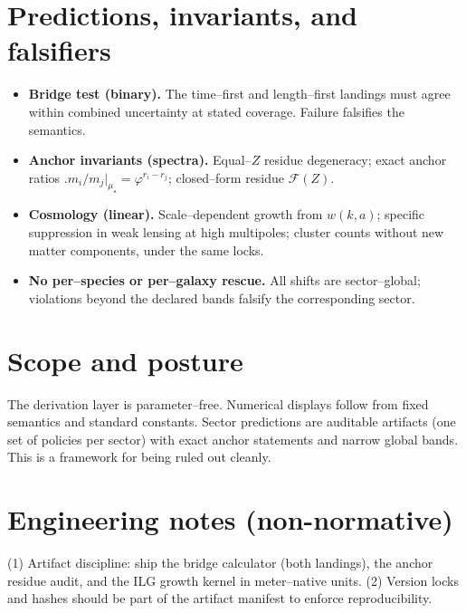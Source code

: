 \documentclass[11pt]{article}
\begin{document}
\section*{Predictions, invariants, and falsifiers}
\begin{itemize}
  \item \textbf{Bridge test (binary).} The time--first and length--first landings must agree within combined uncertainty at stated coverage. Failure falsifies the semantics.
  \item \textbf{Anchor invariants (spectra).} Equal--$Z$ residue degeneracy; exact anchor ratios $\bigl.m_i/m_j\bigr|_{\mu_\star}=\varphi^{r_i-r_j}$; closed--form residue $\mathcal F(Z)$.
  \item \textbf{Cosmology (linear).} Scale--dependent growth from $w(k,a)$; specific suppression in weak lensing at high multipoles; cluster counts without new matter components, under the same locks.
  \item \textbf{No per--species or per--galaxy rescue.} All shifts are sector--global; violations beyond the declared bands falsify the corresponding sector.
\end{itemize}

\section*{Scope and posture}
The derivation layer is parameter--free. Numerical displays follow from fixed semantics and standard constants. Sector predictions are auditable artifacts (one set of policies per sector) with exact anchor statements and narrow global bands. This is a framework for being ruled out cleanly.

\section*{Engineering notes (non-normative)}
(1) Artifact discipline: ship the bridge calculator (both landings), the anchor residue audit, and the ILG growth kernel in meter--native units.
(2) Version locks and hashes should be part of the artifact manifest to enforce reproducibility.

\end{document}
